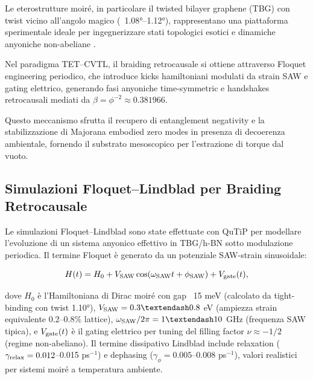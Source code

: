 \documentclass[11pt,a4paper]{article}
\let\oldcite\cite
\renewcommand{\cite}{\protect\oldcite}
\theoremstyle{plain}
\theoremstyle{definition}
\begin{document}
Le eterostrutture moiré, in particolare il twisted bilayer graphene (TBG) con twist vicino all'angolo magico (~1.08°–1.12°), rappresentano una piattaforma sperimentale ideale per ingegnerizzare stati topologici esotici e dinamiche anyoniche non-abeliane \cite{cao2018unconventional, koshino2018flat, ramosalonso2026chargedmoire}. 

\vspace{0.2cm}

Nel paradigma TET–CVTL, il braiding retrocausale si ottiene attraverso Floquet engineering periodico, che introduce kicks hamiltoniani modulati da strain SAW e gating elettrico, generando fasi anyoniche time-symmetric e handshakes retrocausali mediati da $\beta = \phi^{-2} \approx 0.381966$. 

\vspace{0.2cm}

Questo meccanismo sfrutta il recupero di entanglement negativity e la stabilizzazione di Majorana embodied zero modes in presenza di decoerenza ambientale, fornendo il substrato mesoscopico per l'estrazione di torque dal vuoto.


\vspace{0.4cm}

\subsection{Simulazioni Floquet–Lindblad per Braiding Retrocausale}

Le simulazioni Floquet–Lindblad sono state effettuate con QuTiP per modellare l'evoluzione di un sistema anyonico effettivo in TBG/h-BN sotto modulazione periodica. Il termine Floquet è generato da un potenziale SAW-strain sinusoidale:

\begin{equation}
H(t) = H_0 + V_{\rm SAW} \cos(\omega_{\rm SAW} t + \phi_{\rm SAW}) + V_{\rm gate}(t),
\label{eq:floquet_hamiltonian}
\end{equation}


\vspace{0.3cm}

dove $H_0$ è l'Hamiltoniana di Dirac moiré con gap ~15 meV (calcolato da tight-binding con twist 1.10°), $V_{\rm SAW} = 0.3–0.8$ eV (ampiezza strain equivalente 0.2–0.8\% lattice), $\omega_{\rm SAW}/2\pi = 1–10$ GHz (frequenza SAW tipica), e $V_{\rm gate}(t)$ è il gating elettrico per tuning del filling factor $\nu \approx -1/2$ (regime non-abeliano). Il termine dissipativo Lindblad include relaxation ($\gamma_{\rm relax} = 0.012$–0.015 ps$^{-1}$) e dephasing ($\gamma_\phi = 0.005$–0.008 ps$^{-1}$), valori realistici per sistemi moiré a temperatura ambiente.
\end{document}
